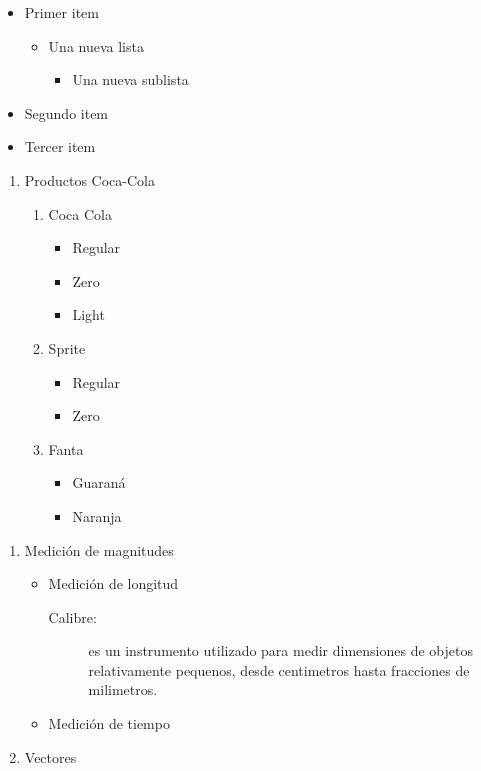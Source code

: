 \documentclass[10pt,a4paper]{article}
\author{Jhabriel Varela}
\begin{document}


\newpage

\begin{itemize}
	\item Primer item
	\begin{itemize}
		\item Una nueva lista
		\begin{itemize}
			\item Una nueva sublista
		\end{itemize}
	\end{itemize}
	\item Segundo item
	\item Tercer item
\end{itemize}

\newpage

\begin{enumerate}
	\item Productos Coca-Cola
	\begin{enumerate}[label*=\arabic*.]
		\item Coca Cola
		\begin{itemize}
			\item Regular
			\item Zero
			\item Light
		\end{itemize}
		\item Sprite
		\begin{itemize}
			\item Regular
			\item Zero
		\end{itemize}
		\item Fanta
		\begin{itemize}
			\item Guaraná
			\item Naranja
		\end{itemize}
	\end{enumerate}
\end{enumerate}

\newpage

\begin{enumerate}
	\item Medición de magnitudes
	\begin{itemize}
		\item Medición de longitud
		\begin{description}
			\item[Calibre:] es un instrumento utilizado para medir
dimensiones de objetos relativamente pequenos, desde centimetros hasta fracciones de milimetros. 
		\end{description}
		\item Medición de tiempo
	\end{itemize}
	\item Vectores
\end{enumerate}
\end{document}
